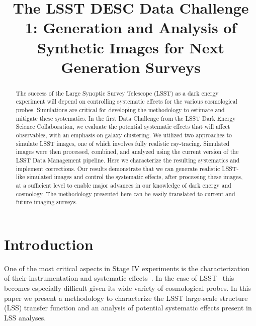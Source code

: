 \documentclass[\docopts]{\docclass}
\begin{document}
\title{ The LSST DESC Data Challenge 1: Generation and Analysis of Synthetic Images for Next Generation Surveys }

\maketitlepre

\begin{abstract}

The success of the Large Synoptic Survey Telescope (LSST) as a dark energy experiment will depend on controlling systematic effects for the various cosmological probes.  Simulations are critical for developing the methodology to estimate and mitigate these systematics.  In the first Data Challenge from the LSST Dark Energy Science Collaboration, we evaluate the potential systematic effects that will affect observables, with an emphasis on galaxy clustering.  We utilized two approaches to simulate LSST images, one of which involves fully realistic ray-tracing.  Simulated images were then processed, combined, and analyzed using the current version of the LSST Data Management pipeline.  Here we characterize the resulting systematics and implement corrections.  Our results demonstrate that we can generate realistic LSST-like simulated images and control the systematic effects, after processing these images, at a sufficient level to enable major advances in our knowledge of dark energy and cosmology. The methodology presented here can be easily translated to current and future imaging surveys.
\end{abstract}


\maketitlepost

%

\section{Introduction}
\label{sec:intro}

One of the most critical aspects in Stage IV experiments is the characterization of their instrumentation and systematic effects~\citep{2006astro.ph..9591A}. In the case of  LSST~\citep{Overview,ScienceBook,WhitePaper} this becomes especially difficult given its wide variety of cosmological probes. In this paper we present a methodology to characterize the LSST large-scale structure (LSS) transfer function and an analysis of potential systematic effects present in LSS analyses.
\end{document}
